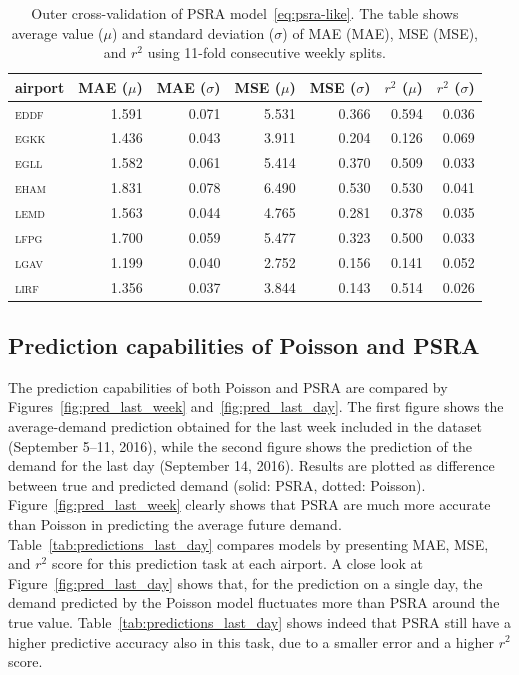 \documentclass[]{elsarticle}
\newcommand{\airp}[1]{\textcolor{#1}{\textsc{#1}}}
\begin{document}
\begin{table}
  \caption{Outer cross-validation of \acs{PSRA} model~\eqref{eq:psra-like}. The table shows average value (\(\mu\)) and standard deviation (\(\sigma\)) of \acl{MAE} (\acs{MAE}), \acl{MSE} (\acs{MSE}), and \(r^2\) using 11-fold consecutive weekly splits.}
  \label{tab:outer_cv}
  \centering
  \begin{tabular}{lrrrrrr}
    \toprule
    airport &  \acs{MAE} (\(\mu\)) &  \acs{MAE} (\(\sigma\)) &  \acs{MSE} (\(\mu\)) &  \acs{MSE} (\(\sigma\)) &  \(r^2\) (\(\mu\)) &  \(r^2\) (\(\sigma\)) \\
    \midrule
    \airp{eddf} & 1.591 & 0.071 & 5.531 & 0.366 & 0.594 & 0.036 \\
    \airp{egkk} & 1.436 & 0.043 & 3.911 & 0.204 & 0.126 & 0.069 \\
    \airp{egll} & 1.582 & 0.061 & 5.414 & 0.370 & 0.509 & 0.033 \\
    \airp{eham} & 1.831 & 0.078 & 6.490 & 0.530 & 0.530 & 0.041 \\
    \airp{lemd} & 1.563 & 0.044 & 4.765 & 0.281 & 0.378 & 0.035 \\
    \airp{lfpg} & 1.700 & 0.059 & 5.477 & 0.323 & 0.500 & 0.033 \\
    \airp{lgav} & 1.199 & 0.040 & 2.752 & 0.156 & 0.141 & 0.052 \\
    \airp{lirf} & 1.356 & 0.037 & 3.844 & 0.143 & 0.514 & 0.026 \\
    \bottomrule
  \end{tabular}
\end{table}

\subsection{Prediction capabilities of Poisson and \acs{PSRA}}\label{sec:comparison}

The prediction capabilities of both Poisson and \ac{PSRA} are compared by Figures~\ref{fig:pred_last_week} and~\ref{fig:pred_last_day}.
The first figure shows the average-demand prediction obtained for the last week included in the dataset (September 5--11, 2016), while the second figure shows the prediction of the demand for the last day (September 14, 2016).
Results are plotted as difference between true and predicted demand (solid: \ac{PSRA}, dotted: Poisson).
Figure~\ref{fig:pred_last_week} clearly shows that \ac{PSRA} are much more accurate than Poisson in predicting the average future demand.
Table~\ref{tab:predictions_last_day} compares models by presenting \ac{MAE}, \ac{MSE}, and \(r^2\) score for this prediction task at each airport.
A close look at Figure~\ref{fig:pred_last_day} shows that, for the prediction on a single day, the demand predicted by the Poisson model fluctuates more than \ac{PSRA} around the true value.
Table~\ref{tab:predictions_last_day} shows indeed that \ac{PSRA} still have a higher predictive accuracy also in this task, due to a smaller error and a higher \(r^2\) score.
\end{document}
